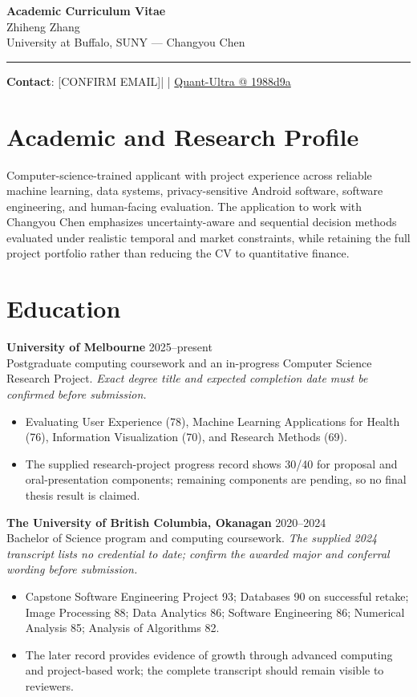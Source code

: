 \documentclass[11pt]{article}
\makeatletter
\newcommand{\ApplicantName}{Zhiheng Zhang}
\newcommand{\ApplicantEmail}{[CONFIRM EMAIL]}
\newcommand{\ApplicantPhone}{[CONFIRM PHONE]}
\newcommand{\ApplicantGitHub}{\href{https://github.com/zhiheng-zhang-Mera/Quant-Ultra/tree/1988d9a8530da91a8158de864d098ea869098923}{Quant-Ultra @ 1988d9a}}
\makeatother
\begin{document}
\begin{center}
{\LARGE\bfseries Academic Curriculum Vitae}\\[0.25em]
{\large \ApplicantName}\\
University at Buffalo, SUNY --- Changyou Chen
\end{center}
\vspace{0.35em}\hrule\vspace{0.65em}

\textbf{Contact}: \ApplicantEmail\quad | \quad \ApplicantPhone\quad | \quad \ApplicantGitHub

\section*{Academic and Research Profile}
Computer-science-trained applicant with project experience across reliable machine learning, data systems, privacy-sensitive Android software, software engineering, and human-facing evaluation. The application to work with Changyou Chen emphasizes uncertainty-aware and sequential decision methods evaluated under realistic temporal and market constraints, while retaining the full project portfolio rather than reducing the CV to quantitative finance.

\section*{Education}
\textbf{University of Melbourne} \hfill 2025--present\\
Postgraduate computing coursework and an in-progress Computer Science Research Project. \textit{Exact degree title and expected completion date must be confirmed before submission.}
\begin{itemize}
\item Evaluating User Experience (78), Machine Learning Applications for Health (76), Information Visualization (70), and Research Methods (69).
\item The supplied research-project progress record shows 30/40 for proposal and oral-presentation components; remaining components are pending, so no final thesis result is claimed.
\end{itemize}

\textbf{The University of British Columbia, Okanagan} \hfill 2020--2024\\
Bachelor of Science program and computing coursework. \textit{The supplied 2024 transcript lists no credential to date; confirm the awarded major and conferral wording before submission.}
\begin{itemize}
\item Capstone Software Engineering Project 93; Databases 90 on successful retake; Image Processing 88; Data Analytics 86; Software Engineering 86; Numerical Analysis 85; Analysis of Algorithms 82.
\item The later record provides evidence of growth through advanced computing and project-based work; the complete transcript should remain visible to reviewers.
\end{itemize}
\end{document}

